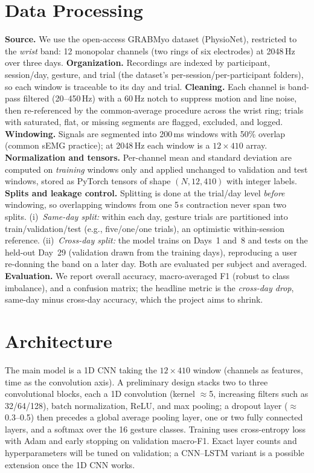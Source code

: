 \documentclass[final]{article}
\begin{document}
\section*{Data Processing}
\textbf{Source.} We use the open-access GRABMyo dataset \citep{pradhan2022grabmyo,jiang2022grabmyophysionet} (PhysioNet), restricted to the \emph{wrist} band: 12 monopolar channels (two rings of six electrodes) at 2048\,Hz over three days. \textbf{Organization.} Recordings are indexed by participant, session/day, gesture, and trial (the dataset's per-session/per-participant folders), so each window is traceable to its day and trial. \textbf{Cleaning.} Each channel is band-pass filtered (20--450\,Hz) with a 60\,Hz notch to suppress motion and line noise, then re-referenced by the common-average procedure across the wrist ring; trials with saturated, flat, or missing segments are flagged, excluded, and logged. \textbf{Windowing.} Signals are segmented into 200\,ms windows with 50\% overlap (common sEMG practice); at 2048\,Hz each window is a $12\times410$ array. \textbf{Normalization and tensors.} Per-channel mean and standard deviation are computed on \emph{training} windows only and applied unchanged to validation and test windows, stored as PyTorch tensors of shape $(N,12,410)$ with integer labels. \textbf{Splits and leakage control.} Splitting is done at the trial/day level \emph{before} windowing, so overlapping windows from one 5\,s contraction never span two splits. (i)~\emph{Same-day split:} within each day, gesture trials are partitioned into train/validation/test (e.g., five/one/one trials), an optimistic within-session reference. (ii)~\emph{Cross-day split:} the model trains on Days~1 and~8 and tests on the held-out Day~29 (validation drawn from the training days), reproducing a user re-donning the band on a later day. Both are evaluated per subject and averaged. \textbf{Evaluation.} We report overall accuracy, macro-averaged F1 (robust to class imbalance), and a confusion matrix; the headline metric is the \emph{cross-day drop}, same-day minus cross-day accuracy, which the project aims to shrink.

\section*{Architecture}
The main model is a 1D CNN taking the $12\times410$ window (channels as features, time as the convolution axis). A preliminary design stacks two to three convolutional blocks, each a 1D convolution (kernel $\approx$5, increasing filters such as 32/64/128), batch normalization, ReLU, and max pooling; a dropout layer ($\approx$0.3--0.5) then precedes a global average pooling layer, one or two fully connected layers, and a softmax over the 16 gesture classes. Training uses cross-entropy loss with Adam and early stopping on validation macro-F1. Exact layer counts and hyperparameters will be tuned on validation; a CNN--LSTM variant is a possible extension once the 1D CNN works.
\end{document}
